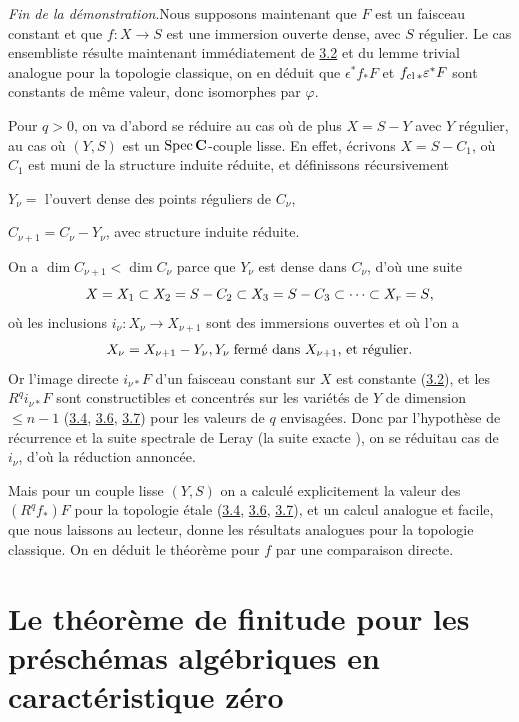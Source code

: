 \documentclass[10pt]{../fichiers-configuration-latex/smfart}
\begin{document}
\noindent
\emph{Fin de la démonstration}.\pageoriginale Nous supposons 
maintenant que $F$ est
un faisceau constant et que $f:X\rightarrow S$ est une immersion
ouverte dense, avec $S$ régulier. Le cas ensembliste résulte
maintenant immédiatement de \hyperref[XVI.prop3.2]{3.2} et du lemme trivial analogue pour la
topologie classique, on en déduit que
$\epsilon^{\ast}f_{\ast}F$ et $f_{\operatorname{cl}\ast}\varepsilon^{\ast}F$ sont
constants de même valeur, donc isomorphes par $\varphi$.

Pour $q>0$, on va d'abord se réduire au cas où de plus $X=S-Y$ avec
$Y$ régulier, \ie au cas où $(Y,S)$ est un $\operatorname{Spec} \mathbf{C}$-couple lisse.
En effet, écrivons $X=S-C_1$, où $C_1$ est muni de la
structure induite réduite, et définissons récursivement

$Y_{\nu}=$ l'ouvert dense des points réguliers de $C_{\nu}$,

$C_{\nu +1}=C_{\nu}-Y_{\nu}$, avec structure induite réduite.

\noindent
On a $\dim C_{\nu+1}<\dim C_{\nu}$ parce que $Y_{\nu}$ est dense dans
$C_{\nu}$, d'où une suite
$$
X=X_1\subset X_2=S-C_2\subset X_3=S-C_3\subset\dots \subset
X_r=S{},
$$
où les inclusions $i_{\nu}:X_{\nu}\rightarrow X_{\nu +1}$ sont des
immersions ouvertes et où l'on a
$$
X_{\nu}=X_{\nu+1}-Y_{\nu}, Y_{\nu}\;\mbox{\rm fermé dans
$X_{\nu+1}$, et régulier}{}.
$$ Or l'image directe $i_{\nu\ast}F$ d'un faisceau constant sur $X$
est constante (\hyperref[XVI.prop3.2]{3.2}), et les $R^{q}i_{\nu\ast}F$ sont
constructibles et concentrés sur les variétés de $Y$ de dimension
$\leq n-1$ (\hyperref[XVI.cor3.4]{3.4}, \hyperref[XVI.cor3.6]{3.6}, \hyperref[XVI.thm3.7]{3.7}) pour
les valeurs de $q$ envisagées. Donc par l'hypothèse de récurrence et
la suite spectrale de Leray (\resp la suite exacte ), on se
réduit\pageoriginale au cas de $i_{\nu}$, d'où la réduction annoncée.

Mais pour un couple lisse $(Y,S)$ on a calculé explicitement la valeur
des $(R^{q}f_{\ast})F$ pour la topologie étale (\hyperref[XVI.cor3.4]{3.4}, \hyperref[XVI.cor3.6]{3.6}, 
\hyperref[XVI.thm3.7]{3.7}), et un
calcul analogue et facile, que nous laissons au lecteur, donne les
résultats analogues pour la topologie classique. On en déduit le
théorème pour $f$ par une comparaison directe.

\section{Le théorème de finitude pour les préschémas algébriques en
caractéristique zéro}
\end{document}
